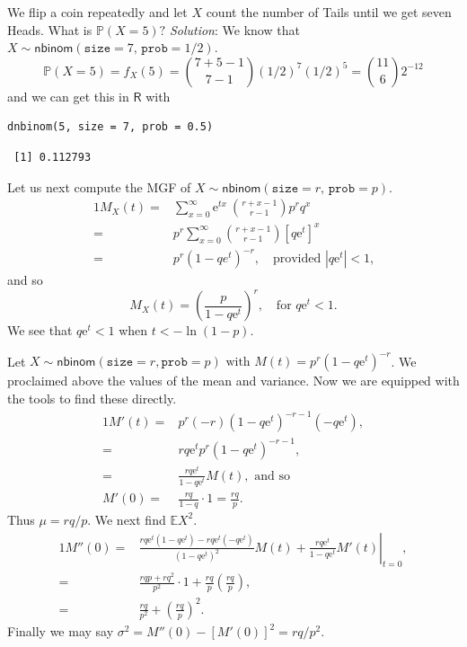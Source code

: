 \documentclass[captions=tableheading]{scrbook}
\begin{document}
\begin{example}
We flip a coin repeatedly and let \(X\) count the number of Tails until we get seven Heads. What is \(\mathbb{P}(X=5)?\)
\emph{Solution}: We know that \(X\sim\mathsf{nbinom}(\mathtt{size}=7,\,\mathtt{prob}=1/2)\).
\[
\mathbb{P}(X=5)=f_{X}(5)={7+5-1 \choose 7-1}(1/2)^{7}(1/2)^{5}={11 \choose 6}2^{-12}
\]
and we can get this in \(\mathsf{R}\) with


\lstset{language=R}
\begin{lstlisting}
dnbinom(5, size = 7, prob = 0.5)
\end{lstlisting}

\begin{verbatim}
 [1] 0.112793
\end{verbatim}

Let us next compute the MGF of \(X\sim\mathsf{nbinom}(\mathtt{size}=r,\,\mathtt{prob}=p)\).
\begin{alignat*}{1}
M_{X}(t)= & \sum_{x=0}^{\infty}\mathrm{e}^{tx}\ {r+x-1 \choose r-1}p^{r}q^{x}\\
= & p^{r}\sum_{x=0}^{\infty}{r+x-1 \choose r-1}[q\mathrm{e}^{t}]^{x}\\
= & p^{r}(1-qe^{t})^{-r},\quad \mbox{provided $|q\mathrm{e}^{t}|<1$,}
\end{alignat*}
and so
\begin{equation}
M_{X}(t)=\left(\frac{p}{1-q\mathrm{e}^{t}}\right)^{r},\quad \mbox{for $q\mathrm{e}^{t}<1$}.
\end{equation}
We see that \(q\mathrm{e}^{t}<1\) when \(t<-\ln(1-p)\).

Let \(X\sim\mathsf{nbinom}(\mathtt{size}=r,\mathtt{prob}=p)\mbox{ with $M(t)=p^{r}(1-q\mathrm{e}^{t})^{-r}$}\). We proclaimed above the values of the mean and variance. Now we are equipped with the tools to find these directly.
\begin{alignat*}{1}
M'(t)= & p^{r}(-r)(1-q\mathrm{e}^{t})^{-r-1}(-q\mathrm{e}^{t}),\\
= & rq\mathrm{e}^{t}p^{r}(1-q\mathrm{e}^{t})^{-r-1},\\
= & \frac{rq\mathrm{e}^{t}}{1-q\mathrm{e}^{t}}M(t),\mbox{ and so }\\
M'(0)= & \frac{rq}{1-q}\cdot1=\frac{rq}{p}.
\end{alignat*}
Thus \(\mu=rq/p\). We next find \(\mathbb{E} X^{2}\).
\begin{alignat*}{1}
M''(0)= & \left.\frac{rq\mathrm{e}^{t}(1-q\mathrm{e}^{t})-rq\mathrm{e}^{t}(-q\mathrm{e}^{t})}{(1-q\mathrm{e}^{t})^{2}}M(t)+\frac{rq\mathrm{e}^{t}}{1-q\mathrm{e}^{t}}M'(t)\right|_{t=0},\\
= & \frac{rqp+rq^{2}}{p^{2}}\cdot1+\frac{rq}{p}\left(\frac{rq}{p}\right),\\
= & \frac{rq}{p^{2}}+\left(\frac{rq}{p}\right)^{2}.
\end{alignat*}
Finally we may say \( \sigma^{2} = M''(0) - [M'(0)]^{2} = rq/p^{2}. \)
\end{example}
\end{document}
